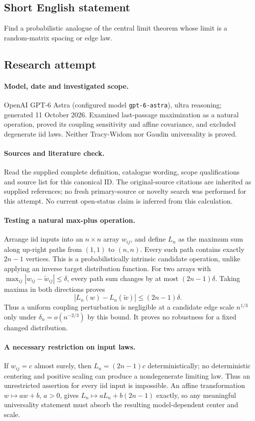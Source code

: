\documentclass[11pt]{article}
\begin{document}
\subsection{Short English statement}
Find a probabilistic analogue of the central limit theorem whose limit is a random-matrix spacing or edge law.
\subsection{Research attempt}
\paragraph{Model, date and investigated scope.}
OpenAI GPT-6 Astra (configured model \texttt{gpt-6-astra}), ultra reasoning; generated 11 October 2026. Examined last-passage maximization as a natural operation, proved its coupling sensitivity and affine covariance, and excluded degenerate iid laws. Neither Tracy-Widom nor Gaudin universality is proved.

\paragraph{Sources and literature check.}
Read the supplied complete definition, catalogue wording, scope qualifications and source list for this canonical ID. The original-source citations are inherited as supplied references; no fresh primary-source or novelty search was performed for this attempt. No current open-status claim is inferred from this calculation.

\paragraph{Testing a natural max-plus operation.}Arrange iid inputs into an \(n\times n\) array \(w_{ij}\), and define \(L_n\) as the maximum sum along up-right paths from \((1,1)\) to \((n,n)\). Every such path contains exactly \(2n-1\) vertices. This is a probabilistically intrinsic candidate operation, unlike applying an inverse target distribution function. For two arrays with \(\max_{ij}|w_{ij}-\widetilde w_{ij}|\le\delta\), every path sum changes by at most \((2n-1)\delta\). Taking maxima in both directions proves
\[|L_n(w)-L_n(\widetilde w)|\le(2n-1)\delta.
\]
Thus a uniform coupling perturbation is negligible at a candidate edge scale \(n^{1/3}\) only under \(\delta_n=o(n^{-2/3})\) by this bound. It proves no robustness for a fixed changed distribution.
\paragraph{A necessary restriction on input laws.}If \(w_{ij}=c\) almost surely, then \(L_n=(2n-1)c\) deterministically; no deterministic centering and positive scaling can produce a nondegenerate limiting law. Thus an unrestricted assertion for every iid input is impossible. An affine transformation \(w\mapsto aw+b\), \(a>0\), gives \(L_n\mapsto aL_n+b(2n-1)\) exactly, so any meaningful universality statement must absorb the resulting model-dependent center and scale.
\end{document}
